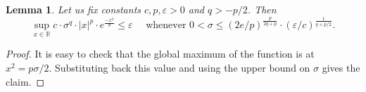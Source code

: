 \documentclass[11pt,a4paper]{article}
\newtheorem{lemma}[theorem]{Lemma}
\theoremstyle{definition}
\theoremstyle{remark}
\newcommand{\0}{\mathbf{0}}
\numberwithin{equation}{section}
\begin{document}
\begin{lemma}
Let us fix constants $c, p, \varepsilon>0$ and $q> -p/2$. Then
\begin{equation}\label{eq:BoundA(x)}
\sup_{x\in\mathbb{R}} c\cdot \sigma^q\cdot |x|^p\cdot e^{\frac{-x^2}{\sigma}} \leq \varepsilon
\quad\text{ whenever } 0<\sigma \leq (2e/p)^{\frac{p}{2q+p}}\cdot (\varepsilon/c)^{\frac{1}{q+p/2}}.
\end{equation}
\end{lemma}
\begin{proof}
It is easy to check that the global maximum of the function is at $x^2=p\sigma/2$. Substituting back
this value and using the upper bound on $\sigma$ gives the claim. 
\end{proof}
\end{document}
